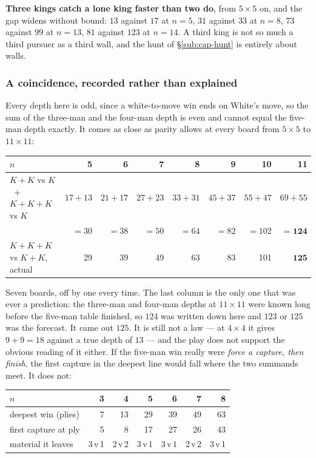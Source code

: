 \documentclass[11pt]{article}
\begin{document}
\textbf{Three kings catch a lone king faster than two do}, from $5\times5$ on,
and the gap widens without bound: $13$ against $17$ at $n=5$, $31$ against $33$
at $n=8$, $73$ against $99$ at $n=13$, $81$ against $123$ at $n=14$. A third
king is not so much a third pursuer as a third wall, and the hunt of
\S\ref{sub:cap-hunt} is entirely about walls.

\subsubsection{A coincidence, recorded rather than explained}\label{sub:kings-sum}

\noindent
Every depth here is odd, since a white-to-move win ends on White's move, so the
sum of the three-man and the four-man depth is even and cannot equal the
five-man depth exactly. It comes as close as parity allows at every board from
$5\times5$ to $11\times11$:

\begin{center}\small
\begin{tabular}{lrrrrrrr}
\toprule
$n$ & 5 & 6 & 7 & 8 & 9 & 10 & \textbf{11}\\
\midrule
$K\!+\!K$ vs $K$ \ $+$ \ $K\!+\!K\!+\!K$ vs $K$ & $17{+}13$ & $21{+}17$ & $27{+}23$ & $33{+}31$ & $45{+}37$ & $55{+}47$ & $69{+}55$\\
                                                & $=30$     & $=38$     & $=50$     & $=64$     & $=82$     & $=102$    & $=\mathbf{124}$\\
$K\!+\!K\!+\!K$ vs $K\!+\!K$, actual            & 29        & 39        & 49        & 63        & 83        & 101       & $\mathbf{125}$\\
\bottomrule
\end{tabular}
\end{center}

\noindent
Seven boards, off by one every time. The last column is the only one that was
ever a prediction: the three-man and four-man depths at $11\times11$ were known
long before the five-man table finished, so $124$ was written down here and
$123$ or $125$ was the forecast. It came out $125$. It is still not a law ---
at $4\times4$ it gives $9+9=18$ against a true depth of $13$ --- and the play does not support the obvious reading of it either. If the five-man
win really were \emph{force a capture, then finish}, the first capture in the
deepest line would fall where the two summands meet. It does not:

\begin{center}\small
\begin{tabular}{lrrrrrr}
\toprule
$n$ & 3 & 4 & 5 & 6 & 7 & 8\\
\midrule
deepest win (plies)  & 7 & 13 & 29 & 39 & 49 & 63\\
first capture at ply & 5 & 8  & 17 & 27 & 26 & 43\\
material it leaves   & 3\,v\,1 & 2\,v\,2 & 3\,v\,1 & 3\,v\,1 & 2\,v\,2 & 3\,v\,1\\
\bottomrule
\end{tabular}
\end{center}
\end{document}
